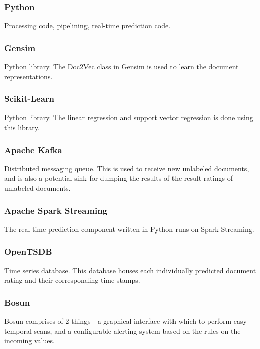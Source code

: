 \documentclass[conference]{IEEEtran}
\begin{document}
        \subsubsection{Python}
            Processing code, pipelining, real-time prediction code\cite{python}.

        \subsubsection{Gensim}
            Python library. The Doc2Vec class in Gensim is used to learn the document representations\cite{doc2vec_api}.
        
        \subsubsection{Scikit-Learn}
            Python library. The linear regression and support vector regression is done using this library\cite{scikit_learn}.
        
        \subsubsection{Apache Kafka}
            Distributed messaging queue. This is used to receive new unlabeled documents, and is also a potential sink for dumping the results of the result ratings of unlabeled documents\cite{kreps2011kafka}.
        
        \subsubsection{Apache Spark Streaming}
            The real-time prediction component written in Python runs on Spark Streaming\cite{zaharia2012discretized}.
        
        \subsubsection{OpenTSDB}
            Time series database. This database houses each individually predicted document rating and their corresponding time-stamps\cite{opentsdb}.
        
        \subsubsection{Bosun}
            Bosun comprises of 2 things - a graphical interface with which to perform easy temporal scans, and a configurable alerting system based on the rules on the incoming values\cite{bosun_repo}. 
\end{document}

